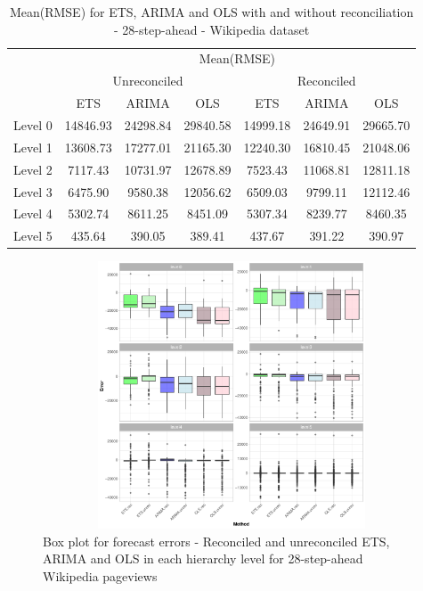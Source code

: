 \documentclass[11pt,a4paper,]{article}
\begin{document}
\begin{table}[t]

\caption{\label{tab:wikipediadataresultRMSE}Mean(RMSE) for ETS, ARIMA and OLS with and without reconciliation - 28-step-ahead - Wikipedia dataset}
\centering
\begin{tabular}{ccccccc}
\toprule
\multicolumn{1}{c}{} & \multicolumn{6}{c}{Mean(RMSE)} \\
\cmidrule(l{3pt}r{3pt}){2-7}
\multicolumn{1}{c}{} & \multicolumn{3}{c}{Unreconciled} & \multicolumn{3}{c}{Reconciled} \\
\cmidrule(l{3pt}r{3pt}){2-4} \cmidrule(l{3pt}r{3pt}){5-7}
 & ETS & ARIMA & OLS & ETS & ARIMA & OLS\\
\midrule
Level 0 & 14846.93 & 24298.84 & 29840.58 & 14999.18 & 24649.91 & 29665.70\\
Level 1 & 13608.73 & 17277.01 & 21165.30 & 12240.30 & 16810.45 & 21048.06\\
Level 2 & 7117.43 & 10731.97 & 12678.89 & 7523.43 & 11068.81 & 12811.18\\
Level 3 & 6475.90 & 9580.38 & 12056.62 & 6509.03 & 9799.11 & 12112.46\\
Level 4 & 5302.74 & 8611.25 & 8451.09 & 5307.34 & 8239.77 & 8460.35\\
Level 5 & 435.64 & 390.05 & 389.41 & 437.67 & 391.22 & 390.97\\
\bottomrule
\end{tabular}
\end{table}

\begin{figure}

{\centering \includegraphics[width=450px,height=300px]{Paper-Figures/results_Wikipedia/boxplot_28} 

}

\caption{Box plot for forecast errors -  Reconciled and unreconciled ETS, ARIMA and OLS in each hierarchy level for 28-step-ahead Wikipedia pageviews}\label{fig:boxplotwiki}
\end{figure}
\end{document}
